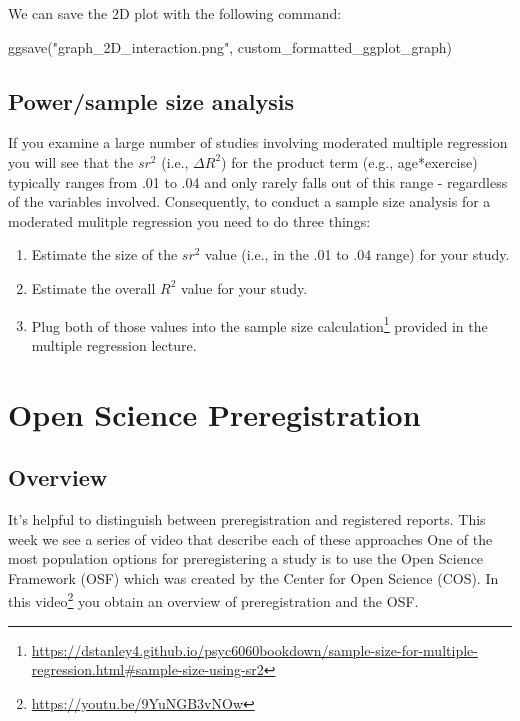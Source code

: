 \documentclass[
]{krantz}
\makeatletter
\newenvironment{Shaded}{\begin{snugshade}}{\end{snugshade}}
\newcommand{\FunctionTok}[1]{\textcolor[rgb]{0,0,0}{#1}}
\newcommand{\NormalTok}[1]{#1}
\newcommand{\StringTok}[1]{\textcolor[rgb]{0.5,0.5,0.5}{#1}}
\renewcommand{\href}[2]{#2\footnote{\url{#1}}}
\newenvironment{kframe}{%
\medskip{}
\setlength{\fboxsep}{.8em}
 \def\at@end@of@kframe{}%
 \ifinner\ifhmode%
  \def\at@end@of@kframe{\end{minipage}}%
  \begin{minipage}{\columnwidth}%
 \fi\fi%
 \def\FrameCommand##1{\hskip\@totalleftmargin \hskip-\fboxsep
 \colorbox{shadecolor}{##1}\hskip-\fboxsep
     \hskip-\linewidth \hskip-\@totalleftmargin \hskip\columnwidth}%
 \MakeFramed {\advance\hsize-\width
   \@totalleftmargin\z@ \linewidth\hsize
   \@setminipage}}%
 {\par\unskip\endMakeFramed%
 \at@end@of@kframe}
\renewenvironment{Shaded}{\begin{kframe}}{\end{kframe}}
\makeatother
\begin{document}
We can save the 2D plot with the following command:

\begin{Shaded}
\begin{Highlighting}[]
\FunctionTok{ggsave}\NormalTok{(}\StringTok{"graph\_2D\_interaction.png"}\NormalTok{, custom\_formatted\_ggplot\_graph)}
\end{Highlighting}
\end{Shaded}

\hypertarget{powersample-size-analysis}{%
\section{Power/sample size analysis}\label{powersample-size-analysis}}

If you examine a large number of studies involving moderated multiple regression you will see that the \(sr^2\) (i.e., \(\Delta R^2\)) for the product term (e.g., age*exercise) typically ranges from .01 to .04 and only rarely falls out of this range - regardless of the variables involved. Consequently, to conduct a sample size analysis for a moderated mulitple regression you need to do three things:

\begin{enumerate}
\def\labelenumi{\arabic{enumi}.}
\item
  Estimate the size of the \(sr^2\) value (i.e., in the .01 to .04 range) for your study.
\item
  Estimate the overall \(R^2\) value for your study.
\item
  Plug both of those values into the \href{https://dstanley4.github.io/psyc6060bookdown/sample-size-for-multiple-regression.html\#sample-size-using-sr2}{sample size calculation} provided in the multiple regression lecture.
\end{enumerate}

\hypertarget{open-science-preregistration}{%
\chapter{Open Science Preregistration}\label{open-science-preregistration}}

\hypertarget{overview-10}{%
\section{Overview}\label{overview-10}}

It's helpful to distinguish between preregistration and registered reports. This week we see a series of video that describe each of these approaches One of the most population options for preregistering a study is to use the Open Science Framework (OSF) which was created by the Center for Open Science (COS). In this \href{https://youtu.be/9YuNGB3vNOw}{video} you obtain an overview of preregistration and the OSF.
\end{document}
